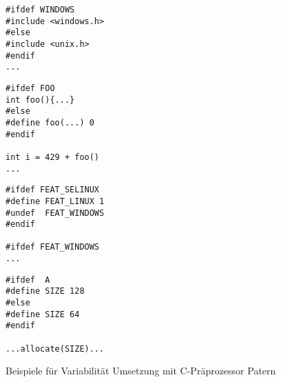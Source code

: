 \begin{figure}[H]
	\hspace{2cm}
	\begin{minipage}{0.5\textwidth}
	\begin{lstlisting}
#ifdef WINDOWS
#include <windows.h>
#else
#include <unix.h>
#endif
...
	\end{lstlisting}
	\end{minipage}
	\begin{minipage}{0.5\textwidth}
	\begin{lstlisting}
#ifdef FOO
int foo(){...}
#else
#define foo(...) 0
#endif

int i = 429 + foo()
...
	\end{lstlisting}	
	\end{minipage}
	
	\hspace{2cm}
	\begin{minipage}{0.5\textwidth}
	\begin{lstlisting}
#ifdef FEAT_SELINUX
#define FEAT_LINUX 1
#undef	FEAT_WINDOWS
#endif

#ifdef FEAT_WINDOWS
...
	\end{lstlisting}		
	\end{minipage}
	\begin{minipage}{0.5\textwidth}
	\begin{lstlisting}
#ifdef 	A
#define SIZE 128
#else
#define SIZE 64
#endif

...allocate(SIZE)...
	\end{lstlisting}	
	\end{minipage}
	
\caption{Beispiele für Variabilität Umsetzung mit C-Präprozessor Patern }
\end{figure}








